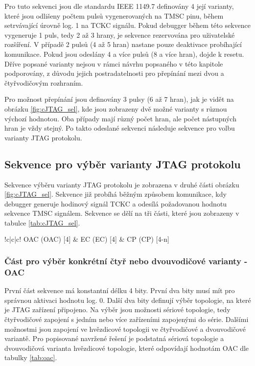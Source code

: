 Pro tuto sekvenci jsou dle standardu IEEE 1149.7 definovány 4 její varianty, které jsou odlišeny počtem pulsů vygenerovaných na TMSC pinu, během setrvávající úrovně log. 1 na TCKC signálu. Pokud debugger během této sekvence vygeneruje 1 puls, tedy 2 až 3 hrany, je sekvence rezervována pro uživatelské rozšíření. V případě 2 pulsů (4 až 5 hran) nastane pouze deaktivace probíhající komunikace. Pokud jsou odeslány 4 a více pulsů (8 a více hran), dojde k resetu. Dříve popsané varianty nejsou v rámci návrhu popsaného v této kapitole podporovány, z důvodu jejich postradatelnosti pro přepínání mezi dvou a čtyřvodičovým rozhraním. \cite{IEEE_1149-7}

Pro možnost přepínání jsou definovány 3 pulsy (6 až 7 hran), jak je vidět na obrázku \ref{fig:cJTAG_sel}, kde jsou zobrazeny dvě možné varianty s různou výchozí hodnotou. Oba případy mají různý počet hran, ale počet nástupných hran je vždy stejný. Po takto odeslané sekvenci následuje sekvence pro volbu varianty JTAG protokolu.

\subsection{Sekvence pro výběr varianty JTAG protokolu}
Sekvence výběru varianty \acs{JTAG} protokolu je zobrazena v druhé části obrázku \ref{fig:cJTAG_sel}. Sekvence již probíhá běžným způsobem komunikace, kdy debugger generuje hodinový signál TCKC a odesílá požadovanou hodnotu sekvence TMSC signálem. Sekvence se dělí na tři části, které jsou zobrazeny v tabulce \ref{tab:cJTAG_sel}.

\begin{table}[!h]
  \caption{Formát sekvence pro výběr varianty JTAG protokolu \cite{IEEE_1149-7}}
  \begin{center}
  	\small
	  \begin{tabular}{!{\vrule width 1.2pt}c|c|c!{\vrule width 1.2pt}}
				\acl{OAC} (\acs{OAC}) [4] & \acl{EC} (\acs{EC}) [4] & \acl{CP} (\acs{CP}) [4-n]\\
		\end{tabular}
  \end{center}
	\label{tab:cJTAG_sel}
\end{table}

\subsubsection{Část pro výběr konkrétní čtyř nebo dvouvodičové varianty - \acs{OAC}}
První část sekvence má konstantní délku 4 bity. První dva bity musí mít pro správnou aktivaci hodnotu log. 0. Další dva bity definují výběr topologie, na které je \acs{JTAG} zařízení připojeno. Na výběr jsou možnosti sériové topologie, tedy čtyřvodičové zapojení s jedním nebo více zařízeními zapojenými do série. Dalšími možnostmi jsou zapojení ve hvězdicové topologii ve čtyřvodičové a dvouvodičové variantě. Pro popisované navržené řešení je podstatná sériová topologie a dvouvodičová varianta hvězdicové topologie, které odpovídají hodnotám \acs{OAC} dle tabulky \ref{tab:oac}. \cite{IEEE_1149-7}

